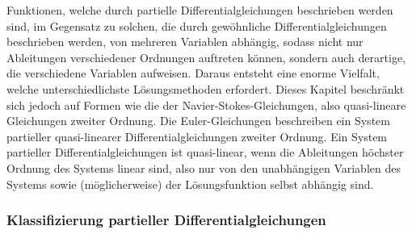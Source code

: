 Funktionen, welche durch partielle Differentialgleichungen beschrieben werden sind, im Gegensatz zu solchen, die durch gewöhnliche Differentialgleichungen beschrieben werden, von mehreren Variablen abhängig, sodass nicht nur Ableitungen verschiedener Ordnungen auftreten können, sondern auch derartige, die verschiedene Variablen aufweisen. Daraus entsteht eine enorme Vielfalt, welche unterschiedlichste Lösungsmethoden erfordert. Dieses Kapitel beschränkt sich jedoch auf Formen wie die der Navier-Stokes-Gleichungen, also quasi-lineare Gleichungen zweiter Ordnung.
Die Euler-Gleichungen beschreiben ein System partieller quasi-linearer Differentialgleichungen zweiter Ordnung. Ein System partieller Differentialgleichungen ist quasi-linear, wenn die Ableitungen höchster Ordnung des Systems linear sind, also nur von den unabhängigen Variablen des Systems sowie (möglicherweise) der Lösungsfunktion selbst abhängig sind. 

\subsubsection{Klassifizierung partieller Differentialgleichungen}

